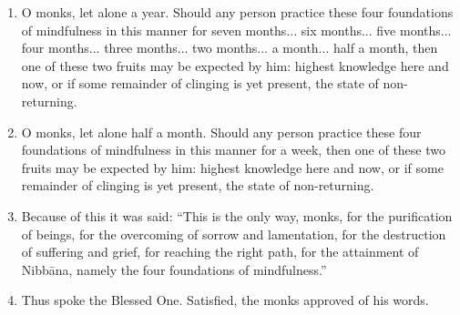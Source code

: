 \documentclass[a4 paper, 12pt]{article}
\begin{document}
\begin{enumerate}[resume]
\item O monks, let alone a year. Should any person practice these four foundations of mindfulness in this manner for seven months... six months... five months... four months... three months... two months... a month... half a month, then one of these two fruits may be expected by him: highest knowledge here and now, or if some remainder of clinging is yet present, the state of non-returning.
\item O monks, let alone half a month. Should any person practice these four foundations of mindfulness in this manner for a week, then one of these two fruits may be expected by him: highest knowledge here and now, or if some remainder of clinging is yet present, the state of non-returning.
\item Because of this it was said: “This is the only way, monks, for the purification of beings, for the overcoming of sorrow and lamentation, for the destruction of suffering and grief, for reaching the right path, for the attainment of Nibbāna, namely the four foundations of mindfulness.”
\item Thus spoke the Blessed One. Satisfied, the monks approved of his words.

\end{enumerate}

\end{document}
